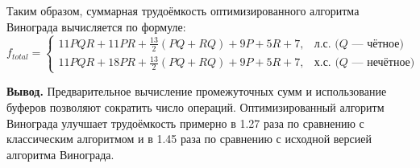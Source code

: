 Таким образом, суммарная трудоёмкость оптимизированного алгоритма Винограда вычисляется по формуле:
\begin{equation}
	f_{total} = 
	\begin{cases}
		11 P Q R + 11 P R + \frac{13}{2} (P Q + R Q) + 9 P + 5 R + 7, & \text{л.с. ($Q$ --- чётное)} \\
		11 P Q R + 18 P R + \frac{13}{2} (P Q + R Q) + 9 P + 5 R + 7, & \text{х.с. ($Q$ --- нечётное)}
	\end{cases}
\end{equation}

\textbf{Вывод.}  
Предварительное вычисление промежуточных сумм и использование буферов позволяют сократить число операций. Оптимизированный алгоритм Винограда улучшает трудоёмкость примерно в 1.27 раза по сравнению с классическим алгоритмом и в 1.45 раза по сравнению с исходной версией алгоритма Винограда.
\clearpage